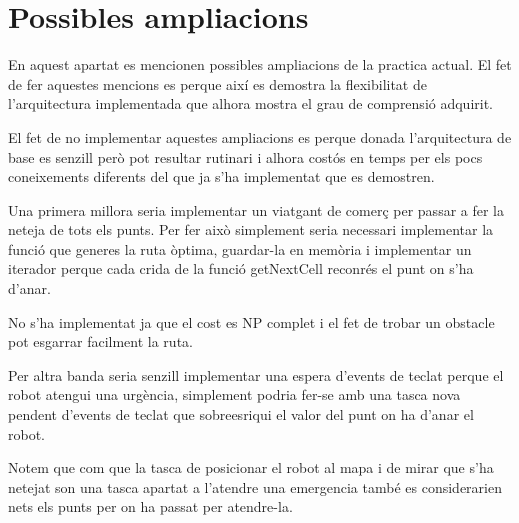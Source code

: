 \section{Possibles ampliacions}

En aquest apartat es mencionen possibles ampliacions de la practica actual. El fet de fer aquestes mencions
es perque així es demostra la flexibilitat de l'arquitectura implementada que alhora mostra el grau
de comprensió adquirit.

El fet de no implementar aquestes ampliacions es perque donada l'arquitectura de base es senzill però pot resultar
rutinari i alhora costós en temps per els pocs coneixements diferents del que ja s'ha implementat que es demostren.

Una primera millora seria implementar un viatgant de comerç per passar a fer la neteja de tots els punts.
Per fer això simplement seria necessari implementar la funció que generes la ruta òptima, guardar-la en 
memòria i implementar un iterador perque cada crida de la funció getNextCell reconrés el punt on s'ha d'anar.

No s'ha implementat ja que el cost es NP complet i el fet de trobar un obstacle pot esgarrar facilment la ruta.

Per altra banda seria senzill implementar una espera d'events de teclat perque el robot atengui una urgència,
simplement podria fer-se amb una tasca nova pendent d'events de teclat que sobreesriqui el valor del  punt
on ha d'anar el robot.

Notem que com que la tasca de posicionar el robot al mapa i de mirar que s'ha netejat son una tasca apartat
a l'atendre una emergencia també es considerarien nets els punts per on ha passat per atendre-la.